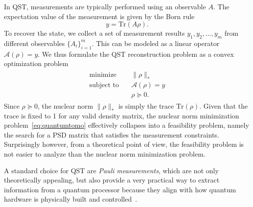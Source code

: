 In QST, measurements are typically performed using an observable $A$. The expectation value of the measurement is given by the Born rule
$$y = \text{Tr}(A\rho).$$
To recover the state, we collect a set of measurement results $y_1, y_2, \dots, y_m$ from different observables $\{A_i\}_{i=1}^m$. This can be modeled as a linear operator $\mathcal{A}(\rho) = y$.
We thus formulate the QST reconstruction problem as a convex optimization problem
\begin{align}\label{eq:quantumtomo}
\begin{split}
\text{minimize} & \quad  \|\rho\|_*  \\
\text{subject to} & \quad \mathcal{A}(\rho) = y \\
& \quad \rho \succeq 0.
\end{split}
\end{align}
Since $\rho \succeq 0$, the nuclear norm $\|\rho\|_*$ is simply the trace $\text{Tr}(\rho)$. Given that the trace is fixed to 1 for any valid density matrix, the nuclear norm minimization problem~\eqref{eq:quantumtomo} effectively collapses into a feasibility problem, namely the search for a PSD matrix that satisfies the measurement constraints. Surprisingly however, from a theoretical point of view, the feasibility problem is not easier to analyze than the nuclear norm minimization problem.

 A standard choice for QST  are {\em Pauli measurements}, which  are not only theoretically appealing, but also provide a very practical way to extract information from a quantum processor because they align with how quantum hardware is physically built and controlled~\cite{altepeter2005photonic}.


